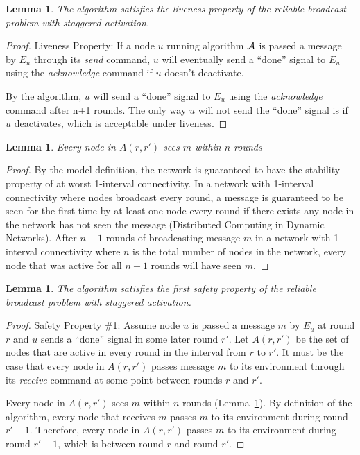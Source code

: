 \documentclass[english]{article}
\newtheorem{lemma}[theorem]{Lemma}
\begin{document}
\begin{lemma}
\label{DeactivationRBLiveness}
The algorithm satisfies the liveness property of the reliable broadcast problem with staggered activation.
\end{lemma}
\begin{proof}
Liveness Property: If a node $u$ running algorithm $\cal A$ is passed a message by $E_u$ through its \textit{send} command, $u$ will eventually send  a ``done'' signal to $E_u$ using the \textit{acknowledge} command if $u$ doesn't deactivate.

By the algorithm, $u$ will send  a ``done'' signal to $E_u$ using the \textit{acknowledge} command after n+1 rounds. The only way $u$ will not send the ``done'' signal is if $u$ deactivates, which is acceptable under liveness.
\end{proof}

\begin{lemma}
\label{RBDeactivationReceive}
Every node in $A(r,r')$ sees $m$ within $n$ rounds
\end{lemma}
\begin{proof}

By the model definition, the network is guaranteed to have the stability property of at worst 1-interval connectivity. In a network with 1-interval connectivity where nodes broadcast every round, a message is guaranteed to be seen for the first time by at least one node every round if there exists any node in the network has not seen the message (Distributed Computing in Dynamic Networks). After $n-1$ rounds of broadcasting message $m$ in a network with 1-interval connectivity where $n$ is the total number of nodes in the network, every node that was active for all $n-1$ rounds will have seen $m$.

\end{proof}


\begin{lemma}
\label{DeactivationRBSafety1}
The algorithm satisfies the first safety property of the reliable broadcast problem with staggered activation.
\end{lemma}
\begin{proof}
Safety Property \#1: Assume node $u$ is passed a message $m$ by $E_u$ at round $r$ and $u$ sends  a ``done'' signal in some later round $r'$. Let $A(r,r')$ be the set of nodes that are active in every round in the interval from $r$ to $r'$. It must be the case that every node in $A(r,r')$ passes message $m$ to its environment through its \textit{receive} command at some point between rounds $r$ and $r'$. 

Every node in $A(r,r')$ sees $m$ within $n$ rounds (Lemma~\ref{RBDeactivationReceive}). By definition of the algorithm, every node that receives $m$ passes $m$ to its environment during round $r'-1$. Therefore, every node in $A(r,r')$ passes $m$ to its environment during round $r'-1$, which is between round $r$ and round $r'$.

\end{proof}
\end{document}
